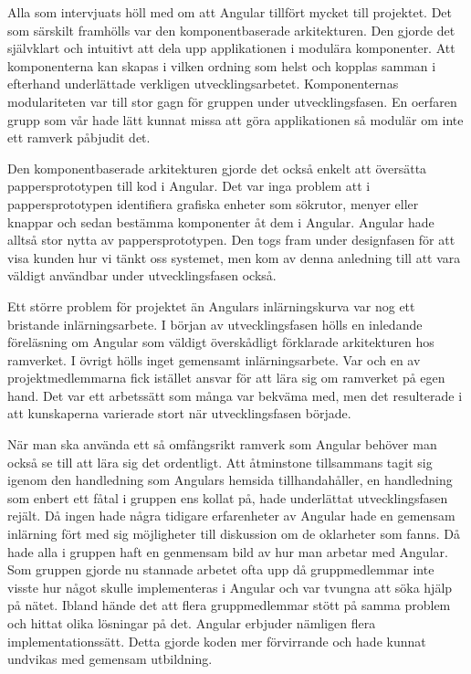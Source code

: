 Alla som intervjuats höll med om att Angular tillfört mycket till projektet. Det som särskilt framhölls var den komponentbaserade arkitekturen. Den gjorde det självklart och intuitivt att dela upp applikationen i modulära komponenter. Att komponenterna kan skapas i vilken ordning som helst och kopplas samman i efterhand underlättade verkligen utvecklingsarbetet. Komponenternas modulariteten var till stor gagn för gruppen under utvecklingsfasen. En oerfaren grupp som vår hade lätt kunnat missa att göra applikationen så modulär om inte ett ramverk påbjudit det.

Den komponentbaserade arkitekturen gjorde det också enkelt att översätta pappersprototypen till kod i Angular. Det var inga problem att i pappersprototypen identifiera grafiska enheter som sökrutor, menyer eller knappar och sedan bestämma komponenter åt dem i Angular. Angular hade alltså stor nytta av pappersprototypen. Den togs fram under designfasen för att visa kunden hur vi tänkt oss systemet, men kom av denna anledning till att vara väldigt användbar under utvecklingsfasen också.

Ett större problem för projektet än Angulars inlärningskurva var nog ett bristande inlärningsarbete. I början av utvecklingsfasen hölls en inledande föreläsning om Angular som väldigt överskådligt förklarade arkitekturen hos ramverket. I övrigt hölls inget gemensamt inlärningsarbete. Var och en av projektmedlemmarna fick istället ansvar för att lära sig om ramverket på egen hand. Det var ett arbetssätt som många var bekväma med, men det resulterade i att kunskaperna varierade stort när utvecklingsfasen började. 

När man ska använda ett så omfångsrikt ramverk som Angular behöver man också se till att lära sig det ordentligt. Att åtminstone tillsammans tagit sig igenom den handledning som Angulars hemsida tillhandahåller, en handledning som enbert ett fåtal i gruppen ens kollat på, hade underlättat utvecklingsfasen rejält. Då ingen hade några tidigare erfarenheter av Angular hade en gemensam inlärning fört med sig möjligheter till diskussion om de oklarheter som fanns. Då hade alla i gruppen haft en genmensam bild av hur man arbetar med Angular. Som gruppen gjorde nu stannade arbetet ofta upp då gruppmedlemmar inte visste hur något skulle implementeras i Angular och var tvungna att söka hjälp på nätet. Ibland hände det att flera gruppmedlemmar stött på samma problem och hittat olika lösningar på det. Angular erbjuder nämligen flera implementationssätt. Detta gjorde koden mer förvirrande och hade kunnat undvikas med gemensam utbildning.     

